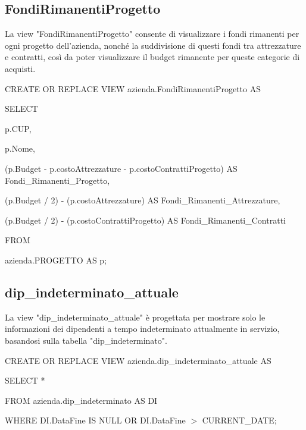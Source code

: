         \subsection{FondiRimanentiProgetto}
        La view "FondiRimanentiProgetto" consente di visualizzare i fondi rimanenti per ogni progetto dell'azienda, nonché la suddivisione di questi fondi tra attrezzature e contratti, così da poter visualizzare il budget rimanente per queste categorie di acquisti.\\
            \ttfamily
                \begin{flushleft}
                    \begin{description}
                        \item CREATE OR REPLACE VIEW azienda.FondiRimanentiProgetto AS
                        \item SELECT          
                        \begin{description}
                            \item p.CUP,
                            \item p.Nome,
                            \item (p.Budget - p.costoAttrezzature - p.costoContrattiProgetto) AS Fondi\_Rimanenti\_Progetto,
                            \item (p.Budget / 2) - (p.costoAttrezzature) AS Fondi\_Rimanenti\_Attrezzature,
                            \item (p.Budget / 2) - (p.costoContrattiProgetto) AS Fondi\_Rimanenti\_Contratti
                        \end{description}
                        \item FROM\\
                        \item azienda.PROGETTO AS p;
                    \end{description}
                \end{flushleft}
            \normalfont

        \subsection{dip\_indeterminato\_attuale}
        La view "dip\_indeterminato\_attuale" è progettata per mostrare solo le informazioni dei dipendenti a tempo indeterminato attualmente in servizio, basandosi sulla tabella "dip\_indeterminato".
            \ttfamily
                \begin{flushleft}
                    \begin{description}
                        \item CREATE OR REPLACE VIEW azienda.dip\_indeterminato\_attuale AS
                        \item SELECT *        
                        \item FROM azienda.dip\_indeterminato AS DI
                        \item WHERE DI.DataFine IS NULL OR DI.DataFine \(>\) CURRENT\_DATE;
                    \end{description}
                \end{flushleft}
         \normalfont


